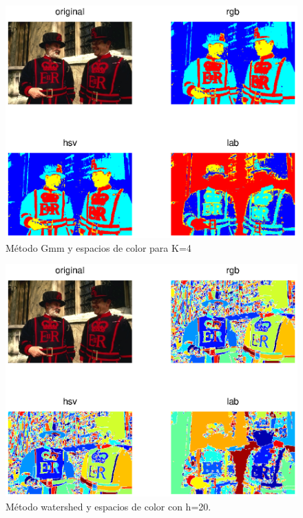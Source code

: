\documentclass[10pt,twocolumn,letterpaper]{article}
\begin{document}
\begin{figure}[h]
\begin{center}
   \includegraphics[scale=0.6]{gmm1.eps}
\end{center}   \caption{Método Gmm y espacios de color para K=4 }
\label{fig:long}
\label{fig:onecol}
\end{figure}

\begin{figure}[h]
\begin{center}
   \includegraphics[scale=0.6]{watershed1.eps}
\end{center}
   \caption{Método watershed y espacios de color con h=20. }
\label{fig:long}
\label{fig:onecol}
\end{figure}
\end{document}
